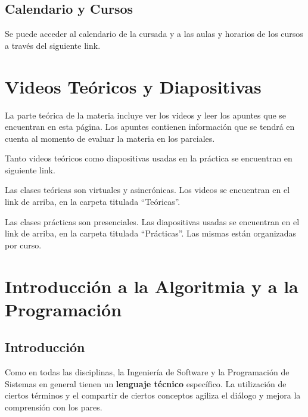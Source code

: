 \documentclass[
  letterpaper,
  DIV=11,
  numbers=noendperiod]{scrreprt}
\begin{document}
\section*{Calendario y Cursos}\label{calendario-y-cursos}


Se puede acceder al calendario de la cursada y a las aulas y horarios de
los cursos a través del siguiente link.


\chapter*{Videos Teóricos y
Diapositivas}\label{videos-teuxf3ricos-y-diapositivas}


La parte teórica de la materia incluye ver los videos y leer los apuntes
que se encuentran en esta página. Los apuntes contienen información que
se tendrá en cuenta al momento de evaluar la materia en los parciales.

Tanto videos teóricos como diapositivas usadas en la práctica se
encuentran en siguiente link.

Las clases teóricas son virtuales y asincrónicas. Los videos se
encuentran en el link de arriba, en la carpeta titulada ``Teóricas''.

Las clases prácticas son presenciales. Las diapositivas usadas se
encuentran en el link de arriba, en la carpeta titulada ``Prácticas''.
Las mismas están organizadas por curso.


\chapter{Introducción a la Algoritmia y a la
Programación}\label{introducciuxf3n-a-la-algoritmia-y-a-la-programaciuxf3n}

\section{Introducción}\label{introducciuxf3n}

Como en todas las disciplinas, la Ingeniería de Software y la
Programación de Sistemas en general tienen un \textbf{lenguaje técnico}
específico. La utilización de ciertos términos y el compartir de ciertos
conceptos agiliza el diálogo y mejora la comprensión con los pares.
\end{document}
